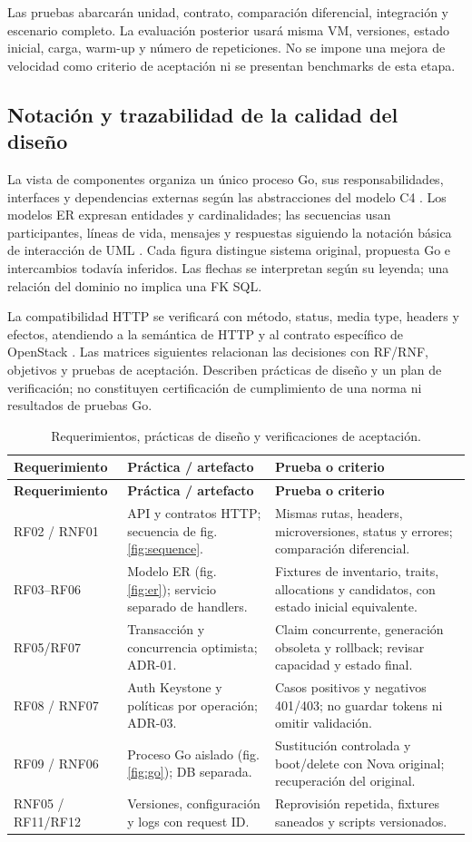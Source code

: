 \documentclass[12pt,a4paper]{article}
\newcommand{\reporttable}[4]{\begingroup\small\setlength{\LTpre}{8pt}\setlength{\LTpost}{8pt}\setlength{\tabcolsep}{4pt}\renewcommand{\arraystretch}{1.15}
\begin{longtable}{#2}\caption{#1}\\\toprule #3\\\midrule\endfirsthead
\toprule #3\\\midrule\endhead\bottomrule\endfoot #4\end{longtable}\endgroup}
\begin{document}
Las pruebas abarcarán unidad, contrato, comparación diferencial, integración y escenario completo. La evaluación posterior usará misma VM, versiones, estado inicial, carga, warm-up y número de repeticiones. No se impone una mejora de velocidad como criterio de aceptación ni se presentan benchmarks de esta etapa.


\subsection{Notación y trazabilidad de la calidad del diseño}
La vista de componentes organiza un único proceso Go, sus responsabilidades, interfaces y dependencias externas según las abstracciones del modelo C4 \cite{c4}. Los modelos ER expresan entidades y cardinalidades; las secuencias usan participantes, líneas de vida, mensajes y respuestas siguiendo la notación básica de interacción de UML \cite{uml}. Cada figura distingue sistema original, propuesta Go e intercambios todavía inferidos. Las flechas se interpretan según su leyenda; una relación del dominio no implica una FK SQL.

La compatibilidad HTTP se verificará con método, status, media type, headers y efectos, atendiendo a la semántica de HTTP y al contrato específico de OpenStack \cite{http}. Las matrices siguientes relacionan las decisiones con RF/RNF, objetivos y pruebas de aceptación. Describen prácticas de diseño y un plan de verificación; no constituyen certificación de cumplimiento de una norma ni resultados de pruebas Go.

\reporttable{Requerimientos, prácticas de diseño y verificaciones de aceptación.}{>{\raggedright\arraybackslash}p{3cm}>{\raggedright\arraybackslash}p{5.3cm}>{\raggedright\arraybackslash}p{6.4cm}}{\textbf{Requerimiento}&\textbf{Práctica / artefacto}&\textbf{Prueba o criterio}}{
RF02 / RNF01&API y contratos HTTP; secuencia de fig. \ref{fig:sequence}.&Mismas rutas, headers, microversiones, status y errores; comparación diferencial.\\*
RF03--RF06&Modelo ER (fig. \ref{fig:er}); servicio separado de handlers.&Fixtures de inventario, traits, allocations y candidatos, con estado inicial equivalente.\\*
RF05/RF07&Transacción y concurrencia optimista; ADR-01.&Claim concurrente, generación obsoleta y rollback; revisar capacidad y estado final.\\*
RF08 / RNF07&Auth Keystone y políticas por operación; ADR-03.&Casos positivos y negativos 401/403; no guardar tokens ni omitir validación.\\*
RF09 / RNF06&Proceso Go aislado (fig. \ref{fig:go}); DB separada.&Sustitución controlada y boot/delete con Nova original; recuperación del original.\\*
RNF05 / RF11/RF12&Versiones, configuración y logs con request ID.&Reprovisión repetida, fixtures saneados y scripts versionados.\\}
\end{document}
